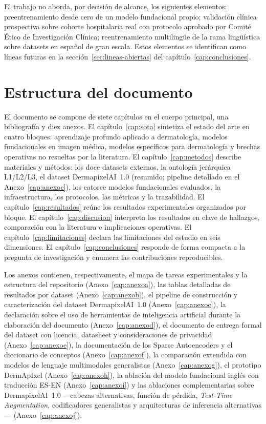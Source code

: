 El trabajo no aborda, por decisión de alcance, los siguientes
elementos: preentrenamiento desde cero de un modelo fundacional
propio; validación clínica prospectiva sobre cohorte hospitalaria
real con protocolo aprobado por Comité Ético de Investigación
Clínica; reentrenamiento multilingüe de la rama lingüística sobre
datasets en español de gran escala. Estos elementos se identifican como líneas
futuras en la sección~\ref{sec:lineas-abiertas} del
capítulo~\ref{cap:conclusiones}.


\section{Estructura del documento}
\label{sec:estructura}

El documento se compone de siete capítulos en el cuerpo principal,
una bibliografía y diez anexos. El capítulo~\ref{cap:sota} sintetiza
el estado del arte en cuatro bloques: aprendizaje profundo aplicado
a dermatología, modelos fundacionales en imagen médica, modelos
específicos para dermatología y brechas operativas no resueltas por
la literatura. El capítulo~\ref{cap:metodos} describe materiales y
métodos: los doce datasets externos, la ontología jerárquica
L1/L2/L3, el dataset DermapixelAI~1.0 (resumido; pipeline detallado
en el Anexo~\ref{cap:anexoc}), los catorce modelos fundacionales
evaluados, la infraestructura, los protocolos, las métricas y la
trazabilidad. El
capítulo~\ref{cap:resultados} reúne los resultados experimentales
organizados por bloque. El capítulo~\ref{cap:discusion} interpreta
los resultados en clave de hallazgos, comparación con la literatura
e implicaciones operativas. El capítulo~\ref{cap:limitaciones}
declara las limitaciones del estudio en seis dimensiones. El
capítulo~\ref{cap:conclusiones} responde de forma compacta a la
pregunta de investigación y enumera las contribuciones
reproducibles.

Los anexos contienen, respectivamente, el mapa de tareas
experimentales y la estructura del repositorio
(Anexo~\ref{cap:anexoa}), las tablas detalladas de resultados por
dataset (Anexo~\ref{cap:anexob}), el pipeline de construcción y
caracterización del dataset DermapixelAI~1.0
(Anexo~\ref{cap:anexoc}), la declaración sobre el uso de
herramientas de inteligencia artificial durante la elaboración del
documento (Anexo~\ref{cap:anexod}), el documento de entrega formal
del dataset con licencia, datasheet y consideraciones de privacidad
(Anexo~\ref{cap:anexoe}), la documentación de los Sparse
Autoencoders y el diccionario de conceptos
(Anexo~\ref{cap:anexof}), la comparación extendida con modelos
de lenguaje multimodales generalistas (Anexo~\ref{cap:anexog}),
el prototipo DermApIxel (Anexo~\ref{cap:anexoh}), la ablación del
modelo fundacional inglés con traducción ES-EN
(Anexo~\ref{cap:anexoi}) y las ablaciones complementarias sobre
DermapixelAI~1.0 ---cabezas alternativas, función de pérdida,
\emph{Test-Time Augmentation}, codificadores generalistas y
arquitecturas de inferencia alternativas--- (Anexo~\ref{cap:anexoj}).
